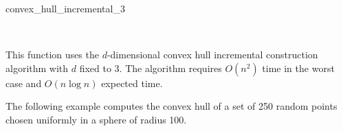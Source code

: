 \begin{ccRefFunction}{convex_hull_incremental_3}
\ccSeeAlso

 \\

\ccImplementation

This function uses the $d$-dimensional convex hull incremental construction 
algorithm \cite{cms:fourresults-93}
with $d$ fixed to 3.  The algorithm requires $O(n^2)$ time in the
worst case and $O(n \log n)$ expected time.

\ccSeeAlso


\ccExample

The following example computes the convex hull of a set of 250 random 
points chosen uniformly in a sphere of radius 100.


\end{ccRefFunction}


